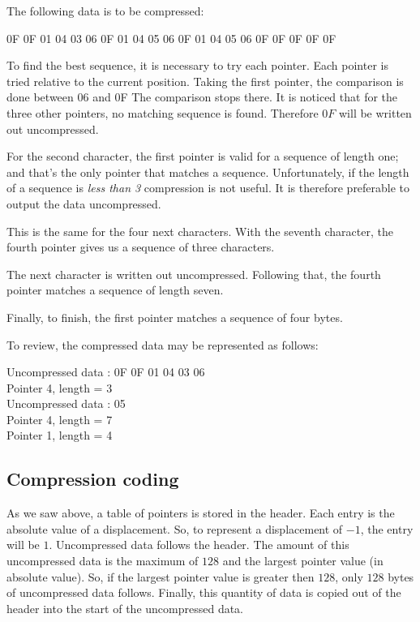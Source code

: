The following data is to be compressed:
\begin{exemple}
0F 0F 01 04 03 06 0F 01 04 05 06 0F 01 04 05 06 0F 0F 0F 0F 0F
\end{exemple}

To find the best sequence, it is necessary to try each pointer. Each pointer is 
tried relative to the current position.
Taking the first pointer, the comparison is done between 06 and 0F
The comparison stops there. It is noticed that for the three other pointers,
no matching sequence is found. Therefore $0F$ will be written out uncompressed.

For the second character, the first pointer is valid for a sequence of length
one; and that's the only pointer that matches a sequence.  Unfortunately, if
the length of a sequence is \emph{less than 3} compression is not useful.
It is therefore preferable to output the data uncompressed.

This is the same for the four next characters.  With the seventh character,
the fourth pointer gives us a sequence of three characters.

The next character is written out uncompressed.  Following that, the fourth
pointer matches a sequence of length seven.

Finally, to finish, the first pointer matches a sequence of four bytes.
\medskip

To review, the compressed data may be represented as follows:
\begin{exemple}
Uncompressed data : 0F 0F 01 04 03 06 \\
Pointer 4, length = 3 \\
Uncompressed data : 05 \\
Pointer 4, length = 7 \\
Pointer 1, length = 4
\end{exemple}


\subsection{Compression coding}
As we saw above, a table of pointers is stored in the header.
Each entry is the absolute value of a displacement.
So, to represent a displacement of $-1$, the entry will be $1$.
Uncompressed data follows the header.
The amount of this uncompressed data is the maximum of $128$ and the largest pointer value (in absolute value). So, if the largest pointer value is greater then $128$, only $128$ bytes
of uncompressed data follows.
Finally, this quantity of data is copied out of the header into the start of
the uncompressed data.

